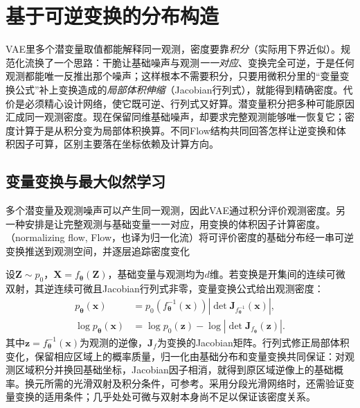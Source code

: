 \section{基于可逆变换的分布构造}

\label{sec:pgm-generative-flows}

\label{sec:pgm-generative-flow-structure}

VAE里多个潜变量取值都能解释同一观测，密度要靠\emph{积分}（实际用下界近似）。规范化流换了一个思路：干脆让基础噪声与观测\emph{一一对应}、变换完全可逆，于是任何观测都能唯一反推出那个噪声；这样根本不需要积分，只要用微积分里的“变量变换公式”补上变换造成的\emph{局部体积伸缩}（Jacobian行列式），就能得到精确密度。代价是必须精心设计网络，使它既可逆、行列式又好算。潜变量积分把多种可能原因汇成同一观测密度。现在保留同维基础噪声，却要求完整观测能够唯一恢复它；密度计算于是从积分变为局部体积换算。不同Flow结构共同回答怎样让逆变换和体积因子可算，区别主要落在坐标依赖及计算方向。

\subsection{变量变换与最大似然学习}
\label{sec:pgm-generative-flow-learning}

\label{sec:pgm-generative-change-of-variables}

多个潜变量及观测噪声可以产生同一观测，因此VAE通过积分评价观测密度。另一种安排是让完整观测与基础变量一一对应，用变换的体积因子计算密度。（normalizing flow, Flow，也译为归一化流）将可评价密度的基础分布经一串可逆变换推送到观测空间，并逐层追踪密度变化

设$\bm Z\sim p_0$，$\bm X=f_{\bm\theta}(\bm Z)$，基础变量与观测均为$d$维。若变换是开集间的连续可微双射，其逆连续可微且Jacobian行列式非零，变量变换公式给出观测密度：
\begin{equation}
  \label{eq:pgm-generative-flow-density}
  \begin{aligned}
    p_{\bm{\theta}}(\bm{x})
      &=p_0(f_{\bm{\theta}}^{-1}(\bm{x}))
         \left|\det\bm{J}_{f_{\bm{\theta}}^{-1}}(\bm{x})\right|,\\
    \log p_{\bm{\theta}}(\bm{x})
      &=\log p_0(\bm{z})-
         \log\left|\det\bm{J}_{f_{\bm{\theta}}}(\bm{z})\right|.
  \end{aligned}
\end{equation}
其中$\bm z=f_{\bm\theta}^{-1}(\bm x)$为观测的逆像，$\bm J_f$为变换的Jacobian矩阵。行列式修正局部体积变化，保留相应区域上的概率质量，归一化由基础分布和变量变换共同保证：对观测区域积分并换回基础坐标，Jacobian因子相消，就得到原区域逆像上的基础概率。换元所需的光滑双射及积分条件，可参考。采用分段光滑网络时，还需验证变量变换的适用条件；几乎处处可微与双射本身尚不足以保证该密度关系。

